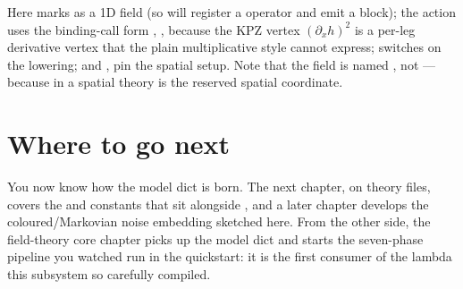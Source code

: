Here  marks  as a 1D field (so  will
register a  operator and emit a  block); the action
uses the binding-call form , ,  because
the KPZ vertex $(\partial_x h)^{2}$ is a per-leg derivative vertex that the plain
multiplicative style cannot express;  switches on the
lowering; and ,  pin the
spatial setup. Note that the field is named , not  --- because in
a spatial theory  is the reserved spatial coordinate.

\section{Where to go next}

You now know how the model dict is born. The next chapter, on theory files, covers
the  and  constants that sit alongside
, and a later chapter develops the coloured/Markovian noise embedding
sketched here. From the other side, the field-theory core chapter picks up the
model dict and starts the seven-phase pipeline you watched run in the quickstart:
it is the first consumer of the  lambda this subsystem so carefully
compiled.
